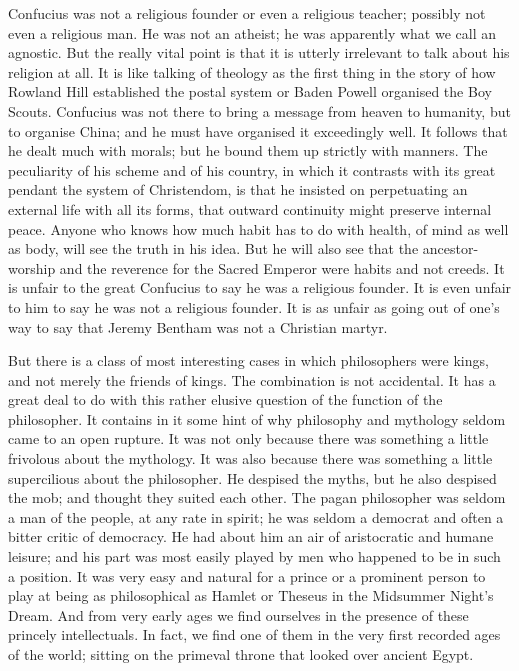 Confucius was not a religious founder or even a religious teacher; possibly not even a religious man. He was not an atheist; he was apparently what we call an agnostic. But the really vital point is that it is utterly irrelevant to talk about his religion at all. It is like talking of theology as the first thing in the story of how Rowland Hill established the postal system or Baden Powell organised the Boy Scouts. Confucius was not there to bring a message from heaven to humanity, but to organise China; and he must have organised it exceedingly well. It follows that he dealt much with morals; but he bound them up strictly with manners. The peculiarity of his scheme and of his country, in which it contrasts with its great pendant the system of Christendom, is that he insisted on perpetuating an external life with all its forms, that outward continuity might preserve internal peace. Anyone who knows how much habit has to do with health, of mind as well as body, will see the truth in his idea. But he will also see that the ancestor-worship and the reverence for the Sacred Emperor were habits and not creeds. It is unfair to the great Confucius to say he was a religious founder. It is even unfair to him to say he was not a religious founder. It is as unfair as going out of one's way to say that Jeremy Bentham was not a Christian martyr.

But there is a class of most interesting cases in which philosophers were kings, and not merely the friends of kings. The combination is not accidental. It has a great deal to do with this rather elusive question of the function of the philosopher. It contains in it some hint of why philosophy and mythology seldom came to an open rupture. It was not only because there was something a little frivolous about the mythology. It was also because there was something a little supercilious about the philosopher. He despised the myths, but he also despised the mob; and thought they suited each other. The pagan philosopher was seldom a man of the people, at any rate in spirit; he was seldom a democrat and often a bitter critic of democracy. He had about him an air of aristocratic and humane leisure; and his part was most easily played by men who happened to be in such a position. It was very easy and natural for a prince or a prominent person to play at being as philosophical as Hamlet or Theseus in the Midsummer Night's Dream. And from very early ages we find ourselves in the presence of these princely intellectuals. In fact, we find one of them in the very first recorded ages of the world; sitting on the primeval throne that looked over ancient Egypt.

